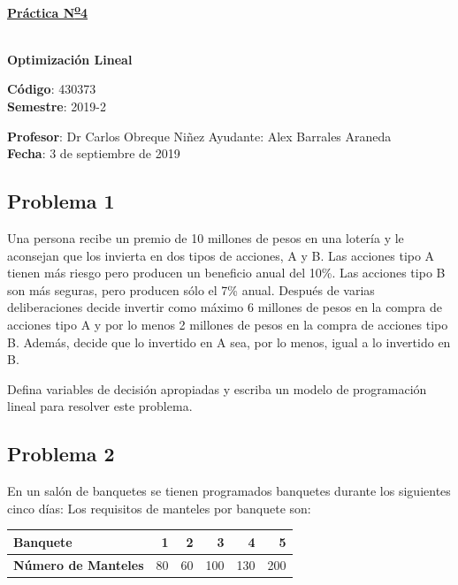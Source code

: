 \documentclass[letterpaper]{article}
\begin{document}
\vspace*{0.5\baselineskip}
\begin{center}
\begin{Large}
\textbf{\underline{Práctica N\textsuperscript{\underline{o}}4}}
\end{Large}\\
\vspace*{0.5\baselineskip}
\textbf{Optimización Lineal} \\
\vspace*{0.5\baselineskip}
\begin{footnotesize}
\textbf{Código}: 430373\\
\textbf{Semestre}: 2019-2
\end{footnotesize}
\end{center}

\noindent \textbf{Profesor}: Dr Carlos Obreque Niñez  \hfill Ayudante: Alex Barrales Araneda\\
\noindent \textbf{Fecha}: 3 de septiembre de 2019

\subsection*{Problema 1}
Una persona recibe un premio de 10 millones de pesos en una lotería y le aconsejan que los invierta en dos tipos de acciones, A y B. Las acciones tipo A tienen más riesgo pero producen un beneficio anual del 10\%. Las acciones tipo B son más seguras, pero producen sólo el 7\% anual. Después de varias deliberaciones decide invertir como máximo 6 millones de pesos en la compra de acciones tipo A y por lo menos 2 millones de pesos en la compra de acciones tipo B. Además, decide que lo invertido en A sea, por lo menos, igual a lo invertido en B. 

Defina variables de decisión apropiadas y escriba un modelo de programación lineal para resolver este problema.

\subsection*{Problema 2}
En un salón de banquetes se tienen programados banquetes durante los siguientes cinco días: Los requisitos de manteles por banquete son:

\begin{table}[H]
\centering
\begin{tabular}{lrrrrr}
\hline
\textbf{Banquete}           & 1  & 2  & 3   & 4   & 5   \\ \hline
\textbf{Número de Manteles} & 80 & 60 & 100 & 130 & 200 \\ \hline
\end{tabular}
\end{table}
\end{document}
